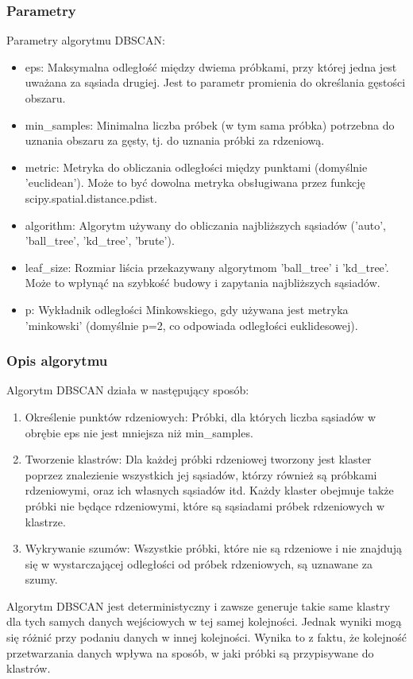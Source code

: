 		\subsubsection{Parametry}
			Parametry algorytmu DBSCAN:
			\begin{itemize}
				\item eps: Maksymalna odległość między dwiema próbkami, przy której jedna jest uważana za sąsiada drugiej. Jest to parametr promienia do określania gęstości obszaru.
				\item min\_samples: Minimalna liczba próbek (w tym sama próbka) potrzebna do uznania obszaru za gęsty, tj. do uznania próbki za rdzeniową.
				\item metric: Metryka do obliczania odległości między punktami (domyślnie 'euclidean'). Może to być dowolna metryka obsługiwana przez funkcję scipy.spatial.distance.pdist.
				\item algorithm: Algorytm używany do obliczania najbliższych sąsiadów ('auto', 'ball\_tree', 'kd\_tree', 'brute').
				\item leaf\_size: Rozmiar liścia przekazywany algorytmom 'ball\_tree' i 'kd\_tree'. Może to wpłynąć na szybkość budowy i zapytania najbliższych sąsiadów.
				\item p: Wykładnik odległości Minkowskiego, gdy używana jest metryka 'minkowski' (domyślnie p=2, co odpowiada odległości euklidesowej).
			\end{itemize}
			
			
		\subsubsection{Opis algorytmu}
			Algorytm DBSCAN działa w następujący sposób:
			\begin{enumerate}
				\item Określenie punktów rdzeniowych: Próbki, dla których liczba sąsiadów w obrębie eps nie jest mniejsza niż min\_samples.
				\item Tworzenie klastrów: Dla każdej próbki rdzeniowej tworzony jest klaster poprzez znalezienie wszystkich jej sąsiadów, którzy również są próbkami rdzeniowymi, oraz ich własnych sąsiadów itd. Każdy klaster obejmuje także próbki nie będące rdzeniowymi, które są sąsiadami próbek rdzeniowych w klastrze.
				\item Wykrywanie szumów: Wszystkie próbki, które nie są rdzeniowe i nie znajdują się w wystarczającej odległości od próbek rdzeniowych, są uznawane za szumy.
			\end{enumerate}
			Algorytm DBSCAN jest deterministyczny i zawsze generuje takie same klastry dla tych samych danych wejściowych w tej samej kolejności. Jednak wyniki mogą się różnić przy podaniu danych w innej kolejności. Wynika to z faktu, że kolejność przetwarzania danych wpływa na sposób, w jaki próbki są przypisywane do klastrów.

